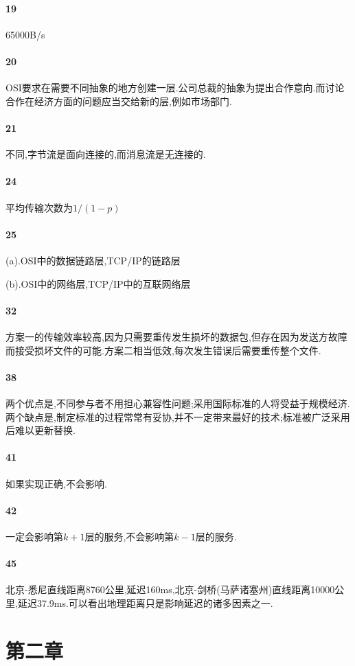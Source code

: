 \documentclass[a4paper]{article}
\begin{document}
\paragraph{19}
65000B/s
\paragraph{20}
OSI要求在需要不同抽象的地方创建一层.公司总裁的抽象为提出合作意向.而讨论合作在经济方面的问题应当交给新的层,例如市场部门.
\paragraph{21}
不同,字节流是面向连接的,而消息流是无连接的.
\paragraph{24}
平均传输次数为$1/(1-p)$
\paragraph{25}
(a).OSI中的数据链路层,TCP/IP的链路层

(b).OSI中的网络层,TCP/IP中的互联网络层
\paragraph{32}
方案一的传输效率较高,因为只需要重传发生损坏的数据包,但存在因为发送方故障而接受损坏文件的可能.方案二相当低效,每次发生错误后需要重传整个文件.
\paragraph{38}
两个优点是,不同参与者不用担心兼容性问题;采用国际标准的人将受益于规模经济.两个缺点是,制定标准的过程常常有妥协,并不一定带来最好的技术;标准被广泛采用后难以更新替换.
\paragraph{41}
如果实现正确,不会影响.
\paragraph{42}
一定会影响第$k+1$层的服务,不会影响第$k-1$层的服务.
\paragraph{45}
北京-悉尼直线距离8760公里,延迟160ms,北京-剑桥(马萨诸塞州)直线距离10000公里,延迟37.9ms.可以看出地理距离只是影响延迟的诸多因素之一.
\section{第二章}
\end{document}

